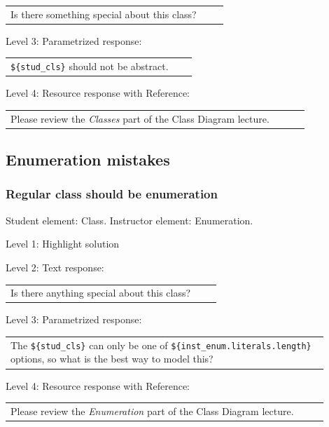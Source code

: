 \begin{tabular}{|p{0.9\linewidth}}
Is there something special about this class?
\end{tabular} \medskip

\noindent Level 3: Parametrized response: \medskip

\begin{tabular}{|p{0.9\linewidth}}
\verb|${stud_cls}| should not be abstract.
\end{tabular} \medskip

\noindent Level 4: Resource response with Reference: \medskip

\begin{tabular}{|p{0.9\linewidth}}
Please review the \textit{Classes} part of the Class Diagram lecture.
\end{tabular} \medskip


\subsection{Enumeration mistakes}

\subsubsection{Regular class should be enumeration}

Student element: Class. Instructor element: Enumeration. \medskip

\noindent Level 1: Highlight solution  \medskip

\noindent Level 2: Text response: \medskip

\begin{tabular}{|p{0.9\linewidth}}
Is there anything special about this class?
\end{tabular} \medskip

\noindent Level 3: Parametrized response: \medskip

\begin{tabular}{|p{0.9\linewidth}}
The \verb|${stud_cls}| can only be one of \verb|${inst_enum.literals.length}| options, so what is the best way to model this?
\end{tabular} \medskip

\noindent Level 4: Resource response with Reference: \medskip

\begin{tabular}{|p{0.9\linewidth}}
Please review the \textit{Enumeration} part of the Class Diagram lecture.
\end{tabular} \medskip


